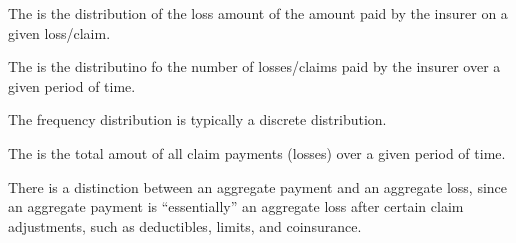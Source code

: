 \documentclass[notoc,notitlepage]{tufte-book}
\begin{document}
\begin{defn}
\label{defn:severity_distribution}
  The  is the distribution of the loss amount of the amount paid by the insurer on a given loss/claim.
\end{defn}

\begin{defn}
\label{defn:frequency_distribution}
  The  is the distributino fo the number of losses/claims paid by the insurer over a given period of time.
\end{defn}

\begin{note}
  The frequency distribution is typically a discrete distribution.
\end{note}

\begin{defn}
\label{defn:aggrement_payment_loss}
  The  is the total amout of all claim payments (losses) over a given period of time.
\end{defn}

\begin{note}
  There is a distinction between an aggregate payment and an aggregate loss, since an aggregate payment is ``essentially'' an aggregate loss after certain claim adjustments, such as deductibles, limits, and coinsurance.
\end{note}



\appendix

\backmatter

\pagestyle{plain}

\nobibliography*


\printindex
\end{document}
